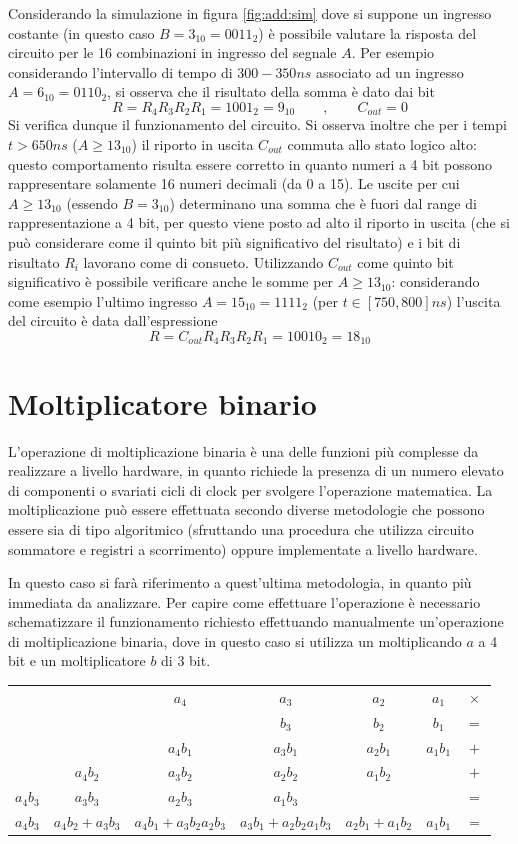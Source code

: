 	Considerando la simulazione in figura \ref{fig:add:sim} dove si suppone un ingresso costante (in questo caso $B=3_{10}=0011_2$) è possibile valutare la risposta del circuito per le 16 combinazioni in ingresso del segnale $A$. Per esempio considerando l'intervallo di tempo di $300-350ns$ associato ad un ingresso $A=6_{10}=0110_2$, si osserva che il risultato della somma è dato dai bit
	\[ R = R_4R_3R_2R_1 = 1001_2 = 9_{10} \qquad, \qquad C_{out} = 0 \]
	Si verifica dunque il funzionamento del circuito. Si osserva inoltre che per i tempi $t > 650ns$ ($A\geq 13_{10}$) il riporto in uscita $C_{out}$ commuta allo stato logico alto: questo comportamento risulta essere corretto in quanto numeri a 4 bit possono rappresentare solamente 16 numeri decimali (da 0 a 15). Le uscite per cui $A\geq 13_{10}$ (essendo $B=3_{10}$) determinano una somma che è fuori dal range di rappresentazione a 4 bit, per questo viene posto ad alto il riporto in uscita (che si può considerare come il quinto bit più significativo del risultato) e i bit di risultato $R_i$ lavorano come di consueto. Utilizzando $C_{out}$ come quinto bit significativo è possibile verificare anche le somme per $A\geq 13_{10}$: considerando come esempio l'ultimo ingresso $A = 15_{10}=1111_2$ (per $t\in [750,800]ns$) l'uscita del circuito è data dall'espressione
	\[ R = C_{out}R_4R_3R_2R_1 = 10010_2 = 18_{10} \]
	
	
\section{Moltiplicatore binario}
	L'operazione di moltiplicazione binaria è una delle funzioni più complesse da realizzare a livello hardware, in quanto richiede la presenza di un numero elevato di componenti o svariati cicli di clock per svolgere l'operazione matematica. La moltiplicazione può essere effettuata secondo diverse metodologie che possono essere sia di tipo algoritmico (sfruttando una procedura che utilizza circuito sommatore e registri a scorrimento) oppure implementate a livello hardware.
	
	In questo caso si farà riferimento a quest'ultima metodologia, in quanto più immediata da analizzare. Per capire come effettuare l'operazione è necessario schematizzare il funzionamento richiesto effettuando manualmente un'operazione di moltiplicazione binaria, dove in questo caso si utilizza un moltiplicando $a$ a 4 bit e un moltiplicatore $b$ di 3 bit.
	
	\begin{center}
	\begin{tabular}{ c c c c c c c}
		&&$a_4$ & $a_3$ & $a_2$ & $a_1$ & $\times$ \\ 
		&&& $b_3$ & $b_2$ & $b_1$ & $=$ \\ \hline		 
		&&$a_4b_1$ & $a_3b_1$ & $a_2b_1$ & $a_1b_1$ & $+$ \\ 
		&$a_4b_2$ & $a_3b_2$ & $a_2b_2$ & $a_1b_2$ & & $+$ \\
		$a_4b_3$ & $a_3b_3$ & $a_2b_3$ & $a_1b_3$ &&& $=$ \\ \hline
		$a_4b_3$ & $a_4b_2+a_3b_3$ & $a_4b_1+a_3b_2a_2b_3$ & $a_3b_1 + a_2b_2a_1b_3$ & $a_2b_1+a_1b_2$ & $a_1b_1$& $=$ 	
	\end{tabular} 
	\end{center}
	
